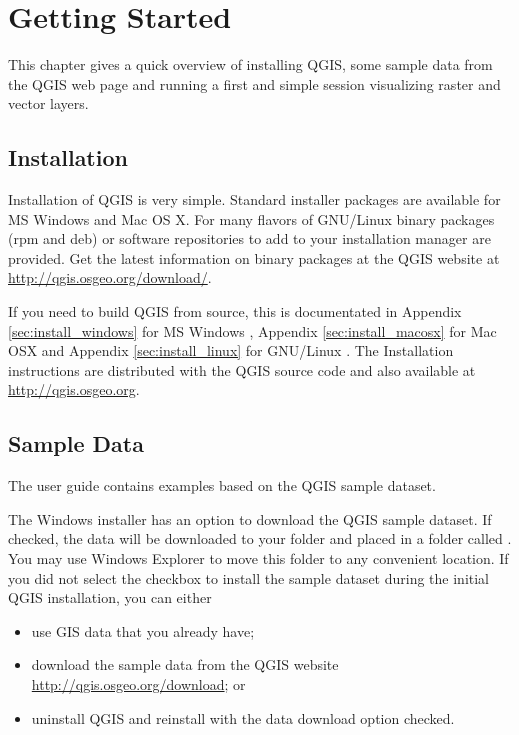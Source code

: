 
\section{Getting Started}\label{label_getstarted}


This chapter gives a quick overview of installing QGIS, some sample 
data from the QGIS web page and running a first and simple session 
visualizing raster and vector layers.

\subsection{Installation}\label{label_installation}

Installation of QGIS is very simple. Standard installer packages are
available for MS Windows and Mac OS X. For many flavors of GNU/Linux binary
packages (rpm and deb) or software repositories to add to your installation
manager are provided. Get the latest information on binary packages at the
QGIS website at \url{http://qgis.osgeo.org/download/}.

If you need to build QGIS from source, this is documentated in Appendix
\ref{sec:install_windows} for MS Windows \win, Appendix
\ref{sec:install_macosx} for Mac OSX \osx and Appendix
\ref{sec:install_linux} for GNU/Linux \nix. The Installation instructions are
distributed with the QGIS source code and also available at
\url{http://qgis.osgeo.org}.

\subsection{Sample Data}\label{label_sampledata}

The user guide contains examples based on the QGIS sample dataset. 

\win The Windows installer has an option to download the QGIS sample dataset.
If checked, the data will be downloaded to your 
folder and placed in a folder called . 
You may use Windows Explorer to move this folder to any convenient location.
If you did not select the checkbox to install the sample dataset
during the initial QGIS installation, you can either
\begin{itemize}
\item use GIS data that you already have;
\item download the sample data from the QGIS website
 \url{http://qgis.osgeo.org/download}; or
\item uninstall QGIS and reinstall with the data download option checked.
\end{itemize}

